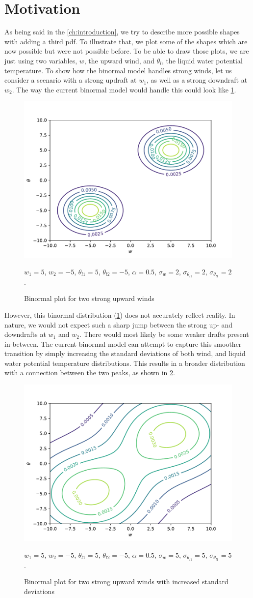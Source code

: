 \section{Motivation}\label{sec:motivation}

As being said in the \cref{ch:introduction},
we try to describe more possible shapes with adding a third \gls{pdf}.
To illustrate that, we plot some of the shapes which are now possible but were not possible before.
To be able to draw those plots, we are just using two variables, $w$, the upward wind,
and $\theta_l$, the liquid water potential temperature.
To show how the binormal model handles strong winds,
let us consider a scenario with a strong updraft at $w_1$, as well as a strong downdraft at $w_2$.
The way the current binormal model would handle this could look like \cref{fig:plot1}.
\begin{figure}[!htb]
    \centering
    \includegraphics[width=.48\textwidth]{include/figures/plot1}
    \caption{Binormal plot for two strong upward winds}
    \label{fig:plot1}
    $w_1 = 5$, $w_2 = -5$, $\theta_{l1} = 5$, $\theta_{l2} = -5$,
    $\alpha = 0.5$, $\sigma_w = 2$, $\sigma_{\theta_{l1}} = 2$, $\sigma_{\theta_{l1}} = 2$.
\end{figure}
However, this binormal distribution (\cref{fig:plot1}) does not accurately reflect reality.
In nature, we would not expect such a sharp jump between the strong up- and downdrafts at $w_1$ and $w_2$.
There would most likely be some weaker drafts present in-between.
The current binormal model can attempt to capture this smoother transition
by simply increasing the standard deviations of both wind,
and liquid water potential temperature distributions.
This results in a broader distribution with a connection between the two peaks,
as shown in \cref{fig:plot2}.
\begin{figure}[!htb]
    \centering
    \includegraphics[width=.5\textwidth]{include/figures/plot2}
    \caption{Binormal plot for two strong upward winds with increased standard deviations}
    \label{fig:plot2}
    $w_1 = 5$, $w_2 = -5$, $\theta_{l1} = 5$, $\theta_{l2} = -5$,
    $\alpha = 0.5$, $\sigma_w = 5$, $\sigma_{\theta_{l1}} = 5$, $\sigma_{\theta_{l1}} = 5$.
\end{figure}
